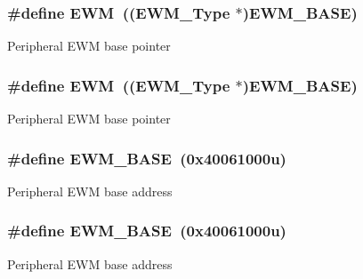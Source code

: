 \subsubsection[{\texorpdfstring{E\+WM}{EWM}}]{\setlength{\rightskip}{0pt plus 5cm}\#define E\+WM~(({\bf E\+W\+M\+\_\+\+Type} $\ast$){\bf E\+W\+M\+\_\+\+B\+A\+SE})}\hypertarget{group__EWM__Peripheral__Access__Layer_ga4c690a7633d3de9e8469adc23f784085}{}\label{group__EWM__Peripheral__Access__Layer_ga4c690a7633d3de9e8469adc23f784085}
Peripheral E\+WM base pointer 
\subsubsection[{\texorpdfstring{E\+WM}{EWM}}]{\setlength{\rightskip}{0pt plus 5cm}\#define E\+WM~(({\bf E\+W\+M\+\_\+\+Type} $\ast$){\bf E\+W\+M\+\_\+\+B\+A\+SE})}\hypertarget{group__EWM__Peripheral__Access__Layer_ga4c690a7633d3de9e8469adc23f784085}{}\label{group__EWM__Peripheral__Access__Layer_ga4c690a7633d3de9e8469adc23f784085}
Peripheral E\+WM base pointer 
\subsubsection[{\texorpdfstring{E\+W\+M\+\_\+\+B\+A\+SE}{EWM_BASE}}]{\setlength{\rightskip}{0pt plus 5cm}\#define E\+W\+M\+\_\+\+B\+A\+SE~(0x40061000u)}\hypertarget{group__EWM__Peripheral__Access__Layer_ga8609fc69000c45828e80571006c9c5c2}{}\label{group__EWM__Peripheral__Access__Layer_ga8609fc69000c45828e80571006c9c5c2}
Peripheral E\+WM base address 
\subsubsection[{\texorpdfstring{E\+W\+M\+\_\+\+B\+A\+SE}{EWM_BASE}}]{\setlength{\rightskip}{0pt plus 5cm}\#define E\+W\+M\+\_\+\+B\+A\+SE~(0x40061000u)}\hypertarget{group__EWM__Peripheral__Access__Layer_ga8609fc69000c45828e80571006c9c5c2}{}\label{group__EWM__Peripheral__Access__Layer_ga8609fc69000c45828e80571006c9c5c2}
Peripheral E\+WM base address 
